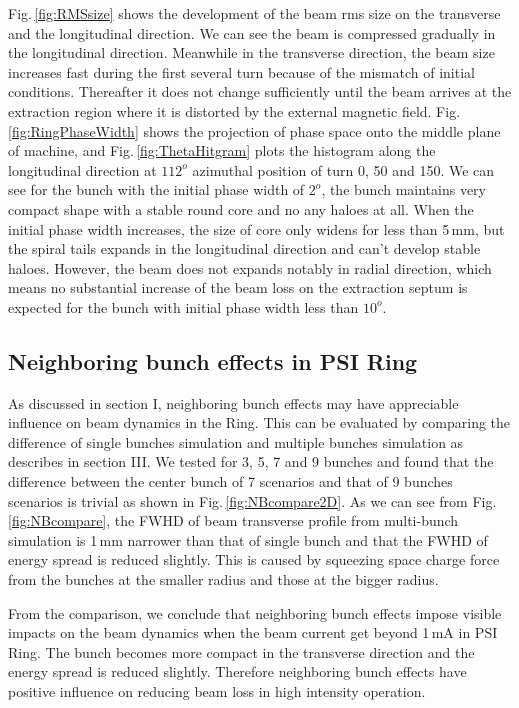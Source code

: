 \documentclass[aps,prstab,twocolumn,superscriptaddress]{revtex4}
\begin{document}
Fig.\,\ref{fig:RMSsize} shows the development of the beam rms size on the transverse and the longitudinal direction. We can see the beam is compressed
gradually in the longitudinal direction. Meanwhile in the transverse direction, the beam size increases fast during the first several turn 
because of the mismatch of initial conditions. Thereafter it does not change sufficiently until the beam arrives at the extraction region 
where it is distorted by the external magnetic field.
Fig.\,\ref{fig:RingPhaseWidth} shows the projection of phase space onto the middle plane of machine, and 
Fig.\,\ref{fig:ThetaHitgram} plots the histogram along the longitudinal direction at $112^o$ azimuthal position of turn 0, 50 and 150.
We can see for the bunch with the initial phase width of $2^o$, the bunch maintains very compact shape with a stable round core and no any haloes at all. 
When the initial phase width increases, the size of core only widens for less than 5\,mm, but the spiral tails expands in the longitudinal direction and 
can't develop stable haloes. However, the beam does not expands notably in radial direction, which means no substantial increase of the beam loss 
on the extraction septum is expected for the bunch with initial phase width less than $10^o$.

\subsection {Neighboring bunch effects in PSI Ring}

As discussed in section I, neighboring bunch effects may have appreciable influence on beam dynamics in the Ring. This can be evaluated by comparing the difference of single bunches simulation and multiple bunches simulation as describes in section III. We tested for 3, 5, 7 and 9 bunches and found that 
the difference between the center bunch of 7 scenarios and that of 9 bunches scenarios is trivial as shown in Fig.\,\ref{fig:NBcompare2D}. 
As we can see from Fig.\,\ref{fig:NBcompare}, the FWHD of beam transverse profile from multi-bunch simulation is 1\,mm narrower than that of single bunch and that the FWHD of energy spread is reduced slightly. This is caused by squeezing space charge force from the bunches at the smaller radius 
and those at the bigger radius. 

From the comparison, we conclude that neighboring bunch effects impose visible impacts on the beam dynamics when the beam current get beyond 1\,mA in PSI Ring. 
The bunch becomes more compact in the transverse direction and the energy spread is reduced slightly. Therefore neighboring bunch effects have positive influence
on reducing beam loss in high intensity operation.
\end{document}
